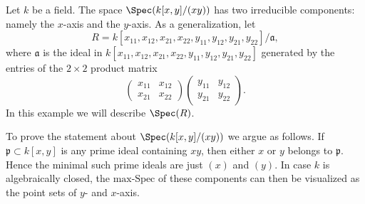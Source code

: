 \begin{example}
\label{editorial-source-example-product-matrices-zero}
Let $k$ be a field. The space $\Spec(k[x, y]/(xy))$
has two irreducible components: namely the $x$-axis and the
$y$-axis. As a generalization, let
$$
R = k[x_{11}, x_{12}, x_{21}, x_{22}, y_{11}, y_{12}, y_{21}, y_{22}]/
\mathfrak a,
$$
where $\mathfrak a$ is the ideal in
$k[x_{11}, x_{12}, x_{21}, x_{22}, y_{11}, y_{12}, y_{21}, y_{22}]$
generated by the entries of the $2 \times 2$ product matrix
$$
\left(
\begin{matrix}
x_{11} & x_{12}\\
x_{21} & x_{22}
\end{matrix}
\right)
 \left(
\begin{matrix}
y_{11} & y_{12}\\
y_{21} & y_{22}
\end{matrix}
\right).
$$
In this example we will describe $\Spec(R)$.

\medskip\noindent
To prove the statement about $\Spec(k[x, y]/(xy))$ we argue as follows.
If $\mathfrak p\subset k[x,y]$ is any prime ideal containing $xy$,
then either $x$ or $y$ belongs to $\mathfrak p$. Hence the minimal such
prime ideals are just $(x)$ and $(y)$. In case $k$ is
algebraically closed, the $\text{max-Spec}$ of these components
can then be visualized as the point sets of $y$- and $x$-axis.


\end{example}

